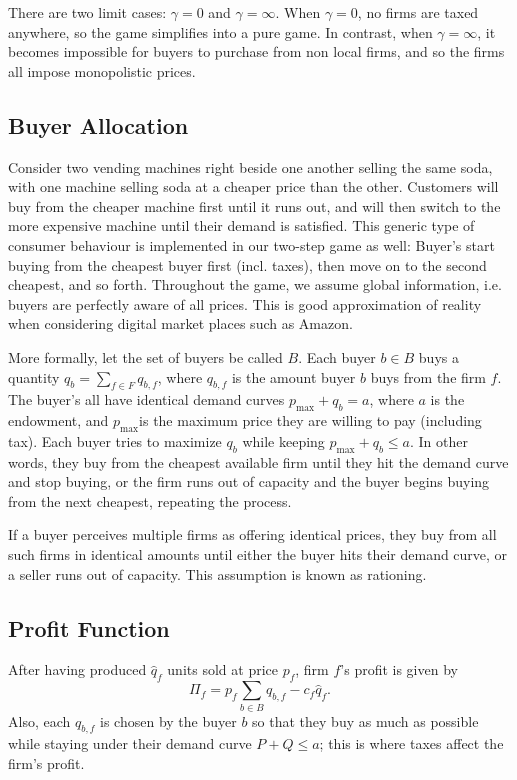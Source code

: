 \documentclass[final,3p,times,authoryear,12pt]{elsarticle}
\begin{document}
There are two limit cases: $\gamma=0$ and $\gamma=\infty$. 
When $\gamma = 0$, no firms are taxed anywhere, so the game simplifies into a pure \cite{kreps1983quantity} game.
In contrast, when $\gamma = \infty$, it becomes impossible for buyers to purchase from non local firms, and so the firms all impose monopolistic prices.

\subsection{Buyer Allocation} 

Consider two vending machines right beside one another selling the same soda, with one machine selling soda at a cheaper price than the other. 
Customers will buy from the cheaper machine first until it runs out, and will then switch to the more expensive machine until their demand is satisfied. 
This generic type of consumer behaviour is implemented in our two-step game as well: 
Buyer's start buying from the cheapest buyer first (incl. taxes), then move on to the second cheapest, and so forth. 
Throughout the game, we assume global information, i.e. buyers are perfectly aware of all prices. 
This is good approximation of reality when considering digital market places such as Amazon. 

More formally, let the set of buyers be called $B$. 
Each buyer $b\in B$ buys a quantity $q_b =\sum_{f\in F} q_{b,f}$, where $q_{b,f}$ is the amount buyer $b$ buys from the firm $f$. 
The buyer's all have identical demand curves $p_\text{max} + q_b = a$, where $a$ is the endowment, and $p_\text{max}$is the maximum price they are willing to pay (including tax). 
Each buyer tries to maximize $q_b$ while keeping $p_\text{max} + q_b \le a$. 
In other words, they buy from the cheapest available firm until they hit the demand curve and stop buying, or the firm runs out of capacity and the buyer begins buying from the next cheapest, repeating the process.

If a buyer perceives multiple firms as offering identical prices, they buy from
all such firms in identical amounts until either the buyer hits their demand
curve, or a seller runs out of capacity. 
This assumption is known as rationing. 

\subsection{Profit Function}
After having produced $\hat q_f$ units sold at price $p_f$, firm $f$'s profit is given by 
\begin{equation}
    \Pi_f = p_f \sum_{b\in B} q_{b,f} - c_f\hat q_f.
\end{equation}
Also, each $q_{b,f}$ is chosen by the buyer $b$ so that they buy as much as possible while staying under their demand curve $P+Q\leq a$; 
this is where taxes affect the firm's profit.
\end{document}
